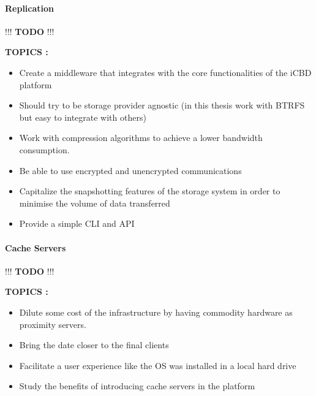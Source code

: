 \paragraph{Replication}
\label{par:replication_goals}

!!! \textbf{TODO} !!!

\textbf{TOPICS :}
\begin{itemize}
	\item Create a middleware that integrates with the core functionalities of the iCBD platform
	\item Should try to be storage provider agnostic (in this thesis work with BTRFS but easy to integrate with others)
	\item Work with compression algorithms to achieve a lower bandwidth consumption.
	\item Be able to use encrypted and unencrypted communications
	\item Capitalize the snapshotting features of the storage system in order to minimise the volume of data transferred
	\item Provide a simple CLI and API
\end{itemize}



\paragraph{Cache Servers}
\label{par:caching_goals}

!!! \textbf{TODO} !!!

\textbf{TOPICS :}
\begin{itemize}
	\item Dilute some cost of the infrastructure by having commodity hardware as proximity servers.
	\item Bring the date closer to the final clients
	\item Facilitate a user experience like the OS was installed in a local hard drive
	\item Study the benefits of introducing cache servers in the platform 
\end{itemize}


